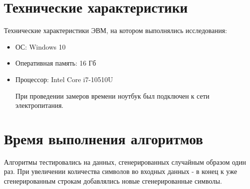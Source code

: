 \documentclass[12pt]{report}
\begin{document}
\newpage

\section{Технические характеристики}
Технические характеристики ЭВМ, на котором выполнялись исследования:
\begin{itemize}
\item ОС: Windows 10
\item Оперативная память: 16 Гб
\item Процессор: Intel Core i7-10510U

При проведении замеров времени ноутбук был подключен к сети электропитания.
\end{itemize}

\section{Время выполнения алгоритмов}
Алгоритмы тестировались на данных, сгенерированных случайным образом один раз. При увеличении количества символов во входных данных - в конец к уже сгенерированным строкам добавлялись новые сгенерированные символы.
\end{document}
